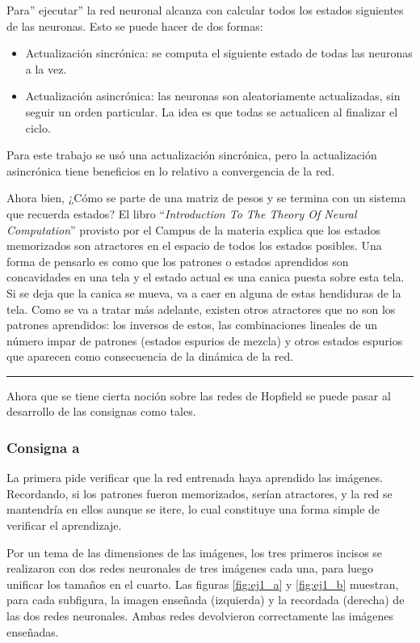 \documentclass[11pt]{article} %
\begin{document}
Para'' ejecutar'' la red neuronal alcanza con calcular todos los estados siguientes de las neuronas. Esto se puede hacer de dos formas:
\begin{itemize}
\item Actualización sincrónica: se computa el siguiente estado de todas las neuronas a la vez.
\item Actualización asincrónica: las neuronas son aleatoriamente actualizadas, sin seguir un orden particular. La idea es que todas se actualicen al finalizar el ciclo. 
\end{itemize}

Para este trabajo se usó una actualización sincrónica, pero la actualización asincrónica tiene beneficios en lo relativo a convergencia de la red. 

Ahora bien, ¿Cómo se parte de una matriz de pesos y se termina con un sistema que recuerda estados? El libro ``\textit{Introduction To The Theory Of Neural Computation}'' provisto por el Campus de la materia explica que los estados memorizados son atractores en el espacio de todos los estados posibles. Una forma de pensarlo es como que los patrones o estados aprendidos son concavidades en una tela y el estado actual es una canica puesta sobre esta tela. Si se deja que la canica se mueva, va a caer en alguna de estas hendiduras de la tela. Como se va a tratar más adelante, existen otros atractores que no son los patrones aprendidos: los inversos de estos, las combinaciones lineales de un número impar de patrones (estados espurios de mezcla) y otros estados espurios que aparecen como consecuencia de la dinámica de la red.

\begin{center}
\rule{0.5\linewidth}{0.5pt} %
\end{center}

Ahora que se tiene cierta noción sobre las redes de Hopfield se puede pasar al desarrollo de las consignas como tales. 

\subsubsection{Consigna a}
La primera pide verificar que la red entrenada haya aprendido las imágenes. Recordando, si los patrones fueron memorizados, serían atractores, y la red se mantendría en ellos aunque se itere, lo cual constituye una forma simple de verificar el aprendizaje. 

Por un tema de las dimensiones de las imágenes, los tres primeros incisos se realizaron con dos redes neuronales de tres imágenes cada una, para luego unificar los tamaños en el cuarto. Las figuras \ref{fig:ej1_a} y \ref{fig:ej1_b} muestran, para cada subfigura, la imagen enseñada (izquierda) y la recordada (derecha) de las dos redes neuronales. Ambas redes devolvieron correctamente las imágenes enseñadas. 
\end{document}
